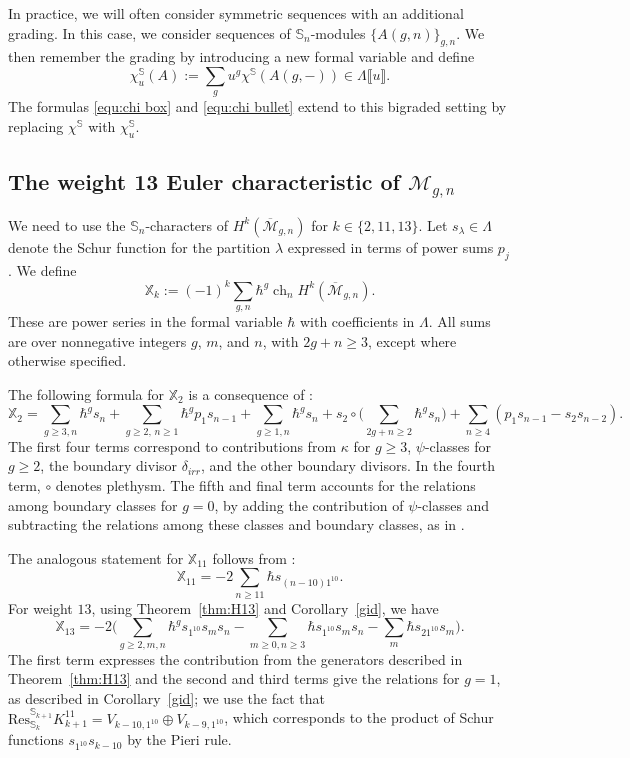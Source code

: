 \documentclass[12pt]{amsart}
\theoremstyle{definition}
\numberwithin{equation}{section}
\renewcommand{\ss}{\mathbb{S}}
\newcommand{\M}{\mathcal{M}}
\DeclareMathOperator{\ch}{ch}
\newcommand{\MM}{\overline{\mathcal{M}}}
\theoremstyle{definition} %
\theoremstyle{remark}
\newcommand{\Res}{\mathrm{Res}}
\begin{document}
In practice, we will often consider symmetric sequences with an additional grading. In this case, we consider sequences of $\ss_n$-modules $\{A(g,n)\}_{g,n}$.
We then remember the grading by introducing a new formal variable and define 
\[
\chi_u^{\ss}(A) := \sum_{g} u^g \chi^{\ss}(A(g,-)) \in \Lambda\llbracket u\rrbracket.
\]
The formulas \eqref{equ:chi box} and \eqref{equ:chi bullet} extend to this bigraded setting by replacing $\chi^\ss$ with $\chi_u^{\ss}$.

\subsection{The weight 13 Euler characteristic of \texorpdfstring{$\M_{g,n}$}{Mgn}}
We need to use the $\ss_n$-characters of $H^k(\MM_{g,n})$ for $k \in \{2, 11, 13\}$. 
Let $s_\lambda \in \Lambda$ denote the Schur function for the partition $\lambda$ expressed in terms of power sums $p_j$. We define $$\mathbb{X}_k := (-1)^k \sum_{g,n} \hbar^{g}
\ch_n H^k(\MM_{g,n}).$$ These are power series in the formal variable $\hbar$ with coefficients in $\Lambda$.  All sums are over nonnegative integers $g$, $m$, and $n$, with  $2g + n \geq 3$, except where otherwise specified.  

The following formula for $\mathbb{X}_2$ is a consequence of \cite[Theorem 2.2]{ArbarelloCornalba}:
\[
\mathbb{X}_2 = \sum_{g\geq 3, n} \hbar^{g} s_{n} + \sum_{g\geq 2, \, n\geq 1} \hbar^{g} p_1 s_{n-1} + \sum_{g\geq 1,n } \hbar^{g} s_{n} + s_2\circ \Big( \sum_{2g+n\geq 2} \hbar^{g} s_n \Big) + \sum_{n\geq 4} (p_1 s_{n-1} -s_2 s_{n-2}).
\]
The first four terms correspond to contributions from $\kappa$ for $g \geq 3$, $\psi$-classes for $g \geq 2$, the boundary divisor $\delta_{irr}$, and the other boundary divisors. In the fourth term, $\circ$ denotes plethysm. The fifth and final term accounts for the relations among boundary classes for $g = 0$, by adding the contribution of $\psi$-classes and subtracting the relations among these classes and boundary classes, as in \cite[Section~3.6]{PayneWillwacher24b}.

The analogous statement for $\mathbb{X}_{11}$ follows from  \cite[Theorem 1.1]{CanningLarsonPayne}:
\[
\mathbb{X}_{11} = -2
\sum_{n\geq 11} \hbar  s_{(n-10) 1^{10}}. 
\]
For weight $13$, using Theorem~\ref{thm:H13} and Corollary~\ref{gid}, we have
\[
\mathbb{X}_{13} = -2 \Big( \sum_{g \geq 2, m, n} \hbar^{g} s_{1^{10}} s_m s_n - \sum_{m \geq 0, n \geq 3} \hbar s_{1^{10}} s_m s_n - \sum_m \hbar s_{2 1^{10}} s_m \Big).
\]
The first term expresses the contribution from the generators described in Theorem~\ref{thm:H13} and the second and third terms give the relations for $g =1$, as described in Corollary~\ref{gid}; we use the fact that $\Res^{\ss_{k+1}}_{\ss_k}K^{11}_{k+1} = V_{k-10,1^{10}} \oplus V_{k-9,1^{10}}$, which corresponds to the product of Schur functions $ s_{1^{10}} s_{k-10}$ by the Pieri rule.
\end{document}
